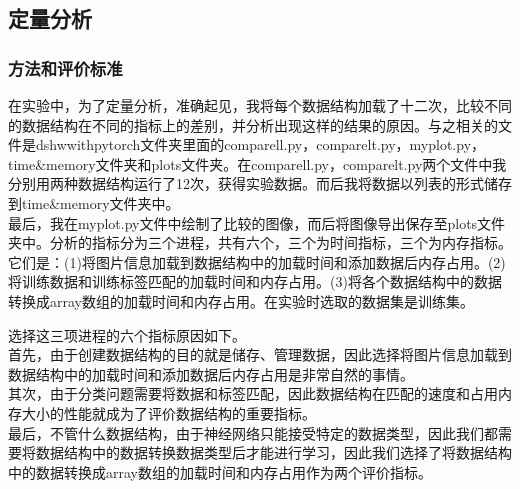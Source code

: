 \subsection{定量分析}
\subsubsection{方法和评价标准}
在实验中，为了定量分析，准确起见，我将每个数据结构加载了十二次，比较不同的数据结构在不同的指标上的差别，并分析出现这样的结果的原因。与之相关的文件是dshwwithpytorch文件夹里面的comparell.py，comparelt.py，myplot.py，time\&memory文件夹和plots文件夹。在comparell.py，comparelt.py两个文件中我分别用两种数据结构运行了12次，获得实验数据。而后我将数据以列表的形式储存到time\&memory文件夹中。\\

最后，我在myplot.py文件中绘制了比较的图像，而后将图像导出保存至plots文件夹中。分析的指标分为三个进程，共有六个，三个为时间指标，三个为内存指标。它们是：(1)将图片信息加载到数据结构中的加载时间和添加数据后内存占用。(2)将训练数据和训练标签匹配的加载时间和内存占用。(3)将各个数据结构中的数据转换成array数组的加载时间和内存占用。在实验时选取的数据集是训练集。

选择这三项进程的六个指标原因如下。\\

首先，由于创建数据结构的目的就是储存、管理数据，因此选择将图片信息加载到数据结构中的加载时间和添加数据后内存占用是非常自然的事情。\\

其次，由于分类问题需要将数据和标签匹配，因此数据结构在匹配的速度和占用内存大小的性能就成为了评价数据结构的重要指标。\\

最后，不管什么数据结构，由于神经网络只能接受特定的数据类型，因此我们都需要将数据结构中的数据转换数据类型后才能进行学习，因此我们选择了将数据结构中的数据转换成array数组的加载时间和内存占用作为两个评价指标。
